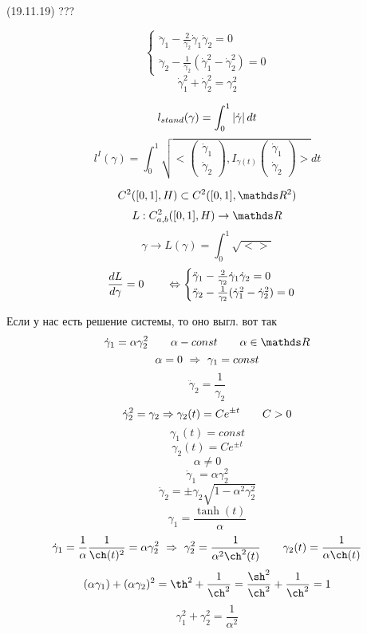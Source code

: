 \documentclass[12pt, fleqn]{article}
\begin{document}
\begin{lect}{(19.11.19) ???}
    \begin{Sol}
        \[\begin{cases}
            \ddot{\gamma}_1 - \frac{2}{\gamma_2} \dot{\gamma}_1 \dot{\gamma}_2 = 0\\
            \ddot{\gamma}_2 - \frac{1}{\gamma_2} (\dot{\gamma}_1^2 - \dot{\gamma}_2^2) = 0
        \end{cases}\]
        \[\dot{\gamma}_1^2 + \dot{\gamma}_2^2 = \gamma_2^2\]

        \[l_{stand}(\gamma) = \int_0^1 \left|\dot{\gamma}\right|dt \]
        \[l^I(\gamma) = \int_0^1 \sqrt{<\begin{pmatrix}
            \dot{\gamma}_1\\
            \dot{\gamma}_2
            \end{pmatrix}, I_{\gamma(t)}  \begin{pmatrix}
            \dot{\gamma}_1\\
            \dot{\gamma}_2
        \end{pmatrix}>}dt\]
    \end{Sol}

    \[C^2([0, 1], H) \subset C^2([0, 1], \R^2)\]
    \[L: C^2_{a,b}([0, 1], H) \to \R \]
    \[\gamma \to L(\gamma) = \int_0^1 \sqrt{ <>}\]
    \[\frac{dL}{d\gamma} = 0 \qquad \Leftrightarrow \begin{cases}
            \ddot{\gamma}_1 - \frac{2}{\gamma_2} \dot{\gamma}_1 \dot{\gamma}_2 = 0\\
            \ddot{\gamma}_2 - \frac{1}{\gamma_2} (\dot{\gamma}_1^2 - \dot{\gamma}_2^2) = 0
        \end{cases} \]

        Если у нас есть решение системы, то оно выгл. вот так
    \[\dot{\gamma}_1 = \alpha \gamma_2^2 \qq \alpha - const \qq \alpha \in \R\]
    \[\alpha = 0 \ \Rightarrow\ \gamma_1 = const\]
    \[\ddot{\gamma}_2 = \frac{1}{\gamma_2}\]
    \[\dot{\gamma}_2^2 = \gamma_2  \Rightarrow \gamma_2(t) = C e^{\pm t} \qquad C > 0 \]
    \[\gamma_1(t) = const\]
    \[\gamma_2(t) = Ce^{\pm t}\]
    \[\alpha \neq 0\]
    \[\dot{\gamma}_1 = \alpha \gamma_2^2\]
    \[\dot{\gamma}_2 = \pm \gamma_2 \sqrt{ 1 - \alpha^2 \gamma_2^2}\]
    \[\gamma_1 = \frac{\tanh (t)}{\alpha}\]
    \[\dot{\gamma}_1 = \frac{1}{\alpha} \frac{1}{\ch(t)^2} = \alpha \gamma_2^2  \ \Ra \
    \gamma_2^2 = \frac{1}{\alpha^2 \ch^2(t)}  \qq \gamma_2(t) = \frac{1}{\alpha \ch(t)}\]
    \[(\alpha \gamma_1) + (\alpha \gamma_2)^2  = \th^2 + \frac{1}{\ch^2} = \frac{\sh^2}{\ch^2} +
    \frac{1}{\ch^2} = 1\]
    \[\gamma_1^2 + \gamma_2^2 = \frac{1}{\alpha^2}\]
\end{lect}
\end{document}
